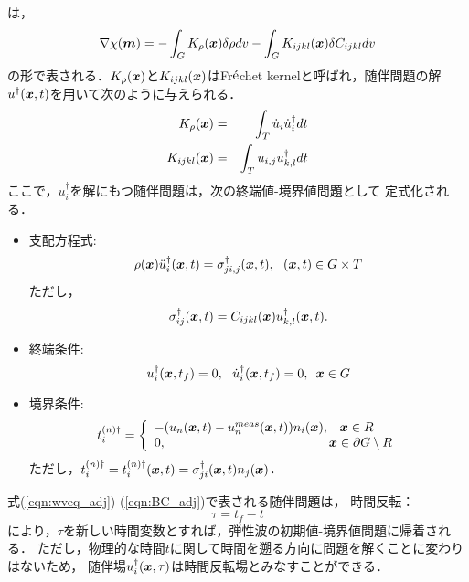 は，
\begin{equation}
	\nabla \chi(\boldsymbol{m}) = 
	-\int_G K_{\rho}(\boldsymbol{x})\delta \rho dv
	- 
	\int_G K_{ijkl}(\boldsymbol{x}) \delta C_{ijkl} dv
	\label{eqn:}
\end{equation}
の形で表される．$K_\rho(\boldsymbol{x})$と$K_{ijkl}(\boldsymbol{x})$はFr$\acute{\rm e}$chet 
kernelと呼ばれ，随伴問題の解$u^{\dagger}(\boldsymbol{x},t)$を用いて次のように与えられる\cite{Fichtner}．
\begin{eqnarray}
	K_\rho(\boldsymbol{x}) &= & \int _T \dot{u}_i \dot{u}^{\dagger}_i dt 
	\label{eqn:K_rho}
	\\
	K_{ijkl}(\boldsymbol{x}) &= & \int _T u_{i,j} u^{\dagger}_{k,l} dt 
	\label{eqn:K_ijkl}
\end{eqnarray}
ここで，$u_i^{\dagger}$を解にもつ随伴問題は，次の終端値-境界値問題として
定式化される．
\begin{itemize}
\item
支配方程式:
\begin{equation}
	\rho(\fat{x}) \ddot{u}_i^{\dagger}(\fat{x},t) =
	\sigma^{\dagger}_{ji,j}(\fat{x},t), \ \ 
	(\fat{x},t) \in G\times T
	\label{eqn:wveq_adj}
\end{equation}
ただし，
\begin{equation}
	\sigma_{ij}^{\dagger}(\boldsymbol{x},t)= C_{ijkl}(\boldsymbol{x})u_{k,l}^{\dagger}(\boldsymbol{x},t).
	\label{eqn:sigma_dgg}
\end{equation}
\item 
終端条件:
\begin{equation}
	u_i^{\dagger}(\boldsymbol{x},t_f) =0,  \ \
	\dot{u}_i^{\dagger}(\boldsymbol{x},t_f) =0,  \ \, \boldsymbol{x}\in G
	\label{eqn:IC_adj}
\end{equation}
\item
境界条件:
\begin{equation}
	t_i^{(n)\dagger}
	=
	\left\{
		\begin{array}{ll}
			-(u_n(\fat{x},t)-u_n^{meas}(\fat{x},t))n_i(\fat{x}), & \fat{x}\in R \\
			0, & \hspace{-3mm} \fat{x} \in \partial G\setminus R
		\end{array}
	\right.
	\label{eqn:BC_adj}
\end{equation}
ただし，$t_i^{(n)\dagger}=t_i^{(n)\dagger}(\boldsymbol{x},t)=\sigma_{ji}^{\dagger}(\boldsymbol{x},t)n_j(\boldsymbol{x})$．
\end{itemize}
式(\ref{eqn:wveq_adj})-(\ref{eqn:BC_adj})で表される随伴問題は，
時間反転：
\begin{equation}
	\tau=t_f-t
	\label{eqn:tau_def}
\end{equation}
により，$\tau$を新しい時間変数とすれば，弾性波の初期値-境界値問題に帰着される．
ただし，物理的な時間$t$に関して時間を遡る方向に問題を解くことに変わりはないため，
随伴場$u_i^{\dagger}(\boldsymbol{x},\tau)$は時間反転場とみなすことができる．
